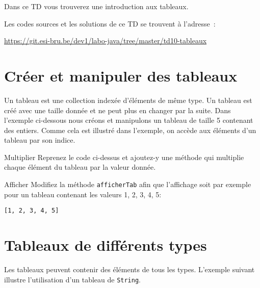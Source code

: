 \documentclass[a4paper,11pt]{article}
\date{2018 -- 2019}
\newcommand{\publicbasepath}{https://git.esi-bru.be/dev1/labo-java/tree/master/td10-tableaux}
\begin{document}
\entete
\titre
{}
\lastedit


	Dans ce TD vous trouverez une introduction aux tableaux.
	 
	Les codes sources et les solutions de ce TD se trouvent à l'adresse~: 
	
	\url{\publicbasepath}	


	\tableofcontents

	\newpage

\section{Créer et manipuler des tableaux}

	Un tableau est une collection indexée d'éléments de même type.
	Un tableau est créé avec une taille donnée et ne peut plus en changer 
	par la suite. Dans l'exemple ci-dessous nous créons et manipulons
	un tableau de taille 5 contenant des entiers.
	Comme cela est illustré dans l'exemple, on accède aux éléments 
	d'un tableau par son indice.

	\bigskip 


 	\begin{Exercice}{Multiplier}	
		Reprenez le code ci-dessus et ajoutez-y une méthode 
		 qui
		 multiplie chaque élément du tableau par la valeur donnée.
	\end{Exercice}
	
	\bigskip
	
	\begin{Exercice}{Afficher}
		Modifiez la méthode \texttt{afficherTab} afin que l'affichage soit par exemple pour un tableau contenant les valeurs 1, 2, 3, 4, 5:
		
		\texttt{[1, 2, 3, 4, 5]}
	\end{Exercice}


\section{Tableaux de différents types}
	Les tableaux peuvent contenir des éléments de tous les types.	
	L'exemple suivant illustre l'utilisation d'un tableau de \texttt{String}.

\end{document}

